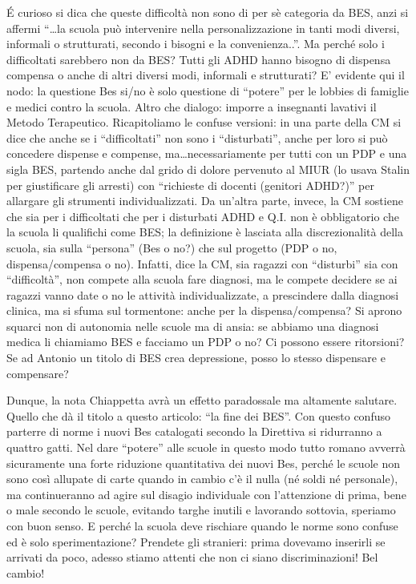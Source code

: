 \'{E} curioso si dica che queste difficoltà non sono di per sè  categoria da BES, anzi si affermi  “…la scuola può intervenire nella personalizzazione in tanti modi diversi, informali o strutturati, secondo i bisogni e la convenienza..”.  Ma perché solo i difficoltati sarebbero  non da BES? Tutti gli ADHD hanno bisogno di dispensa compensa o anche di altri diversi modi, informali e strutturati?
E’ evidente qui il nodo: la questione Bes si/no è solo questione di “potere” per le lobbies di famiglie e medici contro la scuola. Altro che dialogo: imporre a insegnanti lavativi il Metodo Terapeutico.
Ricapitoliamo le confuse versioni: in una parte della CM si dice che anche se i “difficoltati” non sono i “disturbati”, anche per loro si può concedere dispense e compense,  ma…necessariamente per tutti con un PDP e una sigla BES,  partendo anche dal grido di dolore pervenuto al MIUR (lo usava Stalin per giustificare gli arresti) con “richieste di docenti (genitori ADHD?)” per allargare  gli strumenti individualizzati.  Da un'altra parte, invece, la CM sostiene che  sia per i difficoltati che per i disturbati ADHD e Q.I. non è obbligatorio che la scuola li qualifichi come BES; la definizione è lasciata alla discrezionalità della scuola, sia sulla “persona” (Bes o no?) che sul progetto (PDP o no, dispensa/compensa o no).  Infatti, dice la CM,  sia ragazzi con “disturbi” sia  con “difficoltà”,  non compete alla scuola fare diagnosi, ma le compete decidere se ai ragazzi vanno date o no le attività individualizzate, a prescindere dalla diagnosi clinica, ma si sfuma sul tormentone: anche per la dispensa/compensa? Si aprono squarci non di autonomia nelle scuole ma di ansia: se abbiamo una diagnosi medica li chiamiamo  BES e facciamo un PDP o no?  Ci possono essere ritorsioni? Se ad Antonio un titolo di BES crea depressione, posso lo stesso dispensare e compensare?

Dunque, la nota Chiappetta avrà un effetto paradossale ma altamente salutare. Quello che dà il titolo a questo articolo: “la fine dei BES”. Con questo confuso parterre di norme  i nuovi Bes catalogati secondo la Direttiva si ridurranno a quattro gatti. Nel dare “potere” alle scuole in questo modo tutto romano avverrà sicuramente una forte riduzione quantitativa dei nuovi Bes, perché le scuole non sono così allupate di carte quando in cambio  c'è il nulla (né soldi né personale), ma continueranno ad agire sul disagio individuale con l'attenzione di prima, bene o male secondo le scuole, evitando targhe inutili e lavorando sottovia,  speriamo con buon senso. E perché la scuola deve rischiare quando le norme sono confuse ed è solo sperimentazione?  Prendete gli stranieri: prima dovevamo inserirli se arrivati da poco, adesso stiamo attenti che non ci siano discriminazioni! Bel cambio!

